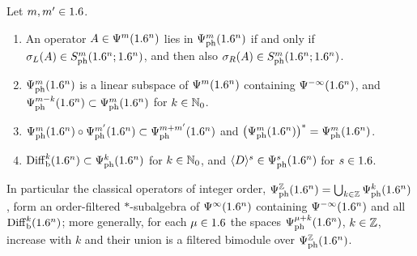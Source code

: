 \begin{proposition}\label{euclidean:prop:ph-algebra}
  Let $m,m'\in1.6$.
  \begin{enumerate}[label=\textup{(\roman*)}]
  \item An operator $A\in\Psi^{m}(1.6^n)$ lies in $\Psi^{m}_{\mathrm{ph}}(1.6^n)$ if
    and only if $\sigma_L(A)\in S^{m}_{\mathrm{ph}}(1.6^n;1.6^n)$, and then also
    $\sigma_R(A)\in S^{m}_{\mathrm{ph}}(1.6^n;1.6^n)$.
  \item $\Psi^{m}_{\mathrm{ph}}(1.6^n)$ is a linear subspace of $\Psi^{m}(1.6^n)$
    containing $\Psi^{-\infty}(1.6^n)$, and
    $\Psi^{m-k}_{\mathrm{ph}}(1.6^n)\subset\Psi^{m}_{\mathrm{ph}}(1.6^n)$ for
    $k\in\mathbb{N}_0$.
  \item $\Psi^{m}_{\mathrm{ph}}(1.6^n)\circ\Psi^{m'}_{\mathrm{ph}}(1.6^n)\subset
    \Psi^{m+m'}_{\mathrm{ph}}(1.6^n)$ and
    $\bigl(\Psi^{m}_{\mathrm{ph}}(1.6^n)\bigr)^*=\Psi^{m}_{\mathrm{ph}}(1.6^n)$.
  \item $\operatorname{Diff}^{k}_{\mathrm b}(1.6^n)\subset\Psi^{k}_{\mathrm{ph}}(1.6^n)$ for
    $k\in\mathbb{N}_0$, and $\langle D\rangle^s\in\Psi^{s}_{\mathrm{ph}}(1.6^n)$ for $s\in1.6$.
  \end{enumerate}
  In particular the classical operators of integer order,
  $\Psi^{\mathbb{Z}}_{\mathrm{ph}}(1.6^n)=\bigcup_{k\in\mathbb{Z}}\Psi^{k}_{\mathrm{ph}}(1.6^n)$,
  form an order-filtered $*$-subalgebra of $\Psi^{\infty}(1.6^n)$ containing
  $\Psi^{-\infty}(1.6^n)$ and all $\operatorname{Diff}^{k}_{\mathrm b}(1.6^n)$; more generally,
  for each $\mu\in1.6$ the spaces $\Psi^{\mu+k}_{\mathrm{ph}}(1.6^n)$, $k\in\mathbb{Z}$,
  increase with $k$ and their union is a filtered bimodule over
  $\Psi^{\mathbb{Z}}_{\mathrm{ph}}(1.6^n)$.
\end{proposition}
